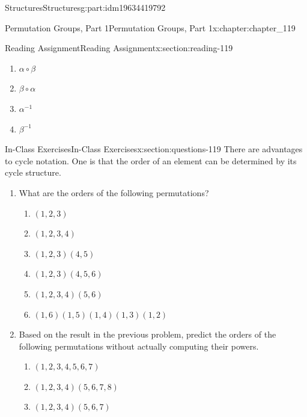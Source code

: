 \documentclass[oneside,10pt,]{book}
\numberwithin{equation}{section}
\begin{document}
\begin{partptx}{Structures}{}{Structures}{}{}{g:part:idm19634419792}
\begin{chapterptx}{Permutation Groups, Part 1}{}{Permutation Groups, Part 1}{}{}{x:chapter:chapter_119}
\begin{sectionptx}{Reading Assignment}{}{Reading Assignment}{}{}{x:section:reading-119}
\begin{enumerate}[label=\arabic*]
\begin{multicols}{2}
\begin{enumerate}[label=(\alph*)]
\item{}\(\displaystyle \alpha \circ \beta\)%
\item{}\(\displaystyle \beta \circ \alpha\)%
\item{}\(\displaystyle \alpha^{-1}\)%
\item{}\(\displaystyle \beta^{-1}\)%
\end{enumerate}
\end{multicols}
%
\end{enumerate}
%
\end{sectionptx}
%
%
\typeout{************************************************}
\typeout{************************************************}
%
\begin{sectionptx}{In-Class Exercises}{}{In-Class Exercises}{}{}{x:section:questions-119}
There are advantages to cycle notation.  One is that the order of an element can be determined by its cycle structure.%
\begin{enumerate}[label=\arabic*.]
\item{}What are the orders of the following permutations?%
\begin{multicols}{3}
\begin{enumerate}[label=(\alph*)]
\item{}\(\displaystyle (1,2,3)\)%
\item{}\(\displaystyle (1,2,3,4)\)%
\item{}\(\displaystyle (1,2,3)(4,5)\)%
\item{}\(\displaystyle (1,2,3)(4,5,6)\)%
\item{}\(\displaystyle (1,2,3,4)(5,6)\)%
\item{}\(\displaystyle (1,6)(1,5)(1,4)(1,3)(1,2)\)%
\end{enumerate}
\end{multicols}
%
\item{}Based on the result in the previous problem, predict the orders of the following permutations without actually computing their powers.%
\begin{multicols}{3}
\begin{enumerate}[label=(\alph*)]
\item{}\(\displaystyle (1,2,3,4,5,6,7)\)%
\item{}\(\displaystyle (1,2,3,4)(5,6,7,8)\)%
\item{}\(\displaystyle (1,2,3,4)(5,6,7)\)%
\end{enumerate}

\end{multicols}
\end{enumerate}
\end{sectionptx}
\end{chapterptx}
\end{partptx}
\end{document}
